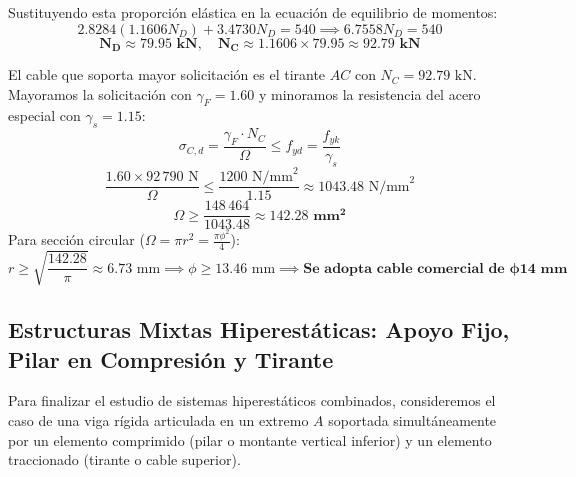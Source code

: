 {    Sustituyendo esta proporción elástica en la ecuación de equilibrio de momentos:
    \begin{equation}
        2.8284 (1.1606 N_D) + 3.4730 N_D = 540 \implies 6.7558 N_D = 540
    \end{equation}
    \begin{equation}
        \mathbf{N_D \approx 79.95\text{ kN}}, \quad \mathbf{N_C \approx 1.1606 \times 79.95 \approx 92.79\text{ kN}}
    \end{equation}


    El cable que soporta mayor solicitación es el tirante $AC$ con $N_C = 92.79\text{ kN}$.
    Mayoramos la solicitación con $\gamma_F = 1.60$ y minoramos la resistencia del acero especial con $\gamma_s = 1.15$:
    \begin{equation}
        \sigma_{C,d} = \frac{\gamma_F \cdot N_C}{\Omega} \le f_{yd} = \frac{f_{yk}}{\gamma_s}
    \end{equation}
    \begin{equation}
        \frac{1.60 \times 92\,790\text{ N}}{\Omega} \le \frac{1200\text{ N/mm}^2}{1.15} \approx 1043.48\text{ N/mm}^2
    \end{equation}
    \begin{equation}
        \Omega \ge \frac{148\,464}{1043.48} \approx \mathbf{142.28\text{ mm}^2}
    \end{equation}
    Para sección circular ($\Omega = \pi r^2 = \frac{\pi \phi^2}{4}$):
    \begin{equation}
        r \ge \sqrt{\frac{142.28}{\pi}} \approx 6.73\text{ mm} \implies \phi \ge 13.46\text{ mm} \implies \mathbf{\text{Se adopta cable comercial de }\phi 14\text{ mm}}
    \end{equation}
}

\subsection{Estructuras Mixtas Hiperestáticas: Apoyo Fijo, Pilar en Compresión y Tirante}

Para finalizar el estudio de sistemas hiperestáticos combinados, consideremos el caso de una viga rígida articulada en un extremo $A$ soportada simultáneamente por un elemento comprimido (pilar o montante vertical inferior) y un elemento traccionado (tirante o cable superior).

